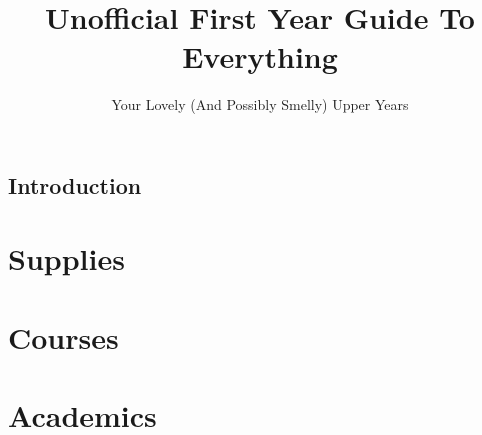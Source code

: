 \documentclass[12pt]{report}
\author{Your Lovely (And Possibly Smelly) Upper Years}
\title{Unofficial First Year Guide To Everything}
\begin{document}
\maketitle
\tableofcontents

\section{Introduction}

\chapter{Supplies}


\chapter{Courses}
%

\chapter{Academics}

\end{document}
